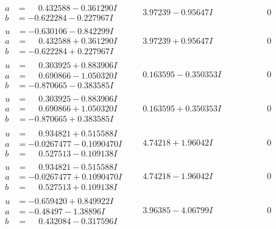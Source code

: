 \documentclass[1p]{elsarticle_modified}
\theoremstyle{definition}
\begin{document}
$$\begin{array}{c|c|c}
\begin{aligned}
a &= \phantom{-}0.432588 - 0.361290 I \\
b &= -0.622284 - 0.227967 I\end{aligned}
 & \phantom{-}3.97239 - 0.95647 I & \phantom{-0.000000 } 0 \\ \hline\begin{aligned}
u &= -0.630106 - 0.842299 I \\
a &= \phantom{-}0.432588 + 0.361290 I \\
b &= -0.622284 + 0.227967 I\end{aligned}
 & \phantom{-}3.97239 + 0.95647 I & \phantom{-0.000000 } 0 \\ \hline\begin{aligned}
u &= \phantom{-}0.303925 + 0.883906 I \\
a &= \phantom{-}0.690866 - 1.050320 I \\
b &= -0.870665 - 0.383585 I\end{aligned}
 & \phantom{-}0.163595 - 0.350353 I & \phantom{-0.000000 } 0 \\ \hline\begin{aligned}
u &= \phantom{-}0.303925 - 0.883906 I \\
a &= \phantom{-}0.690866 + 1.050320 I \\
b &= -0.870665 + 0.383585 I\end{aligned}
 & \phantom{-}0.163595 + 0.350353 I & \phantom{-0.000000 } 0 \\ \hline\begin{aligned}
u &= \phantom{-}0.934821 + 0.515588 I \\
a &= -0.0267477 - 0.1090470 I \\
b &= \phantom{-}0.527513 - 0.109138 I\end{aligned}
 & \phantom{-}4.74218 + 1.96042 I & \phantom{-0.000000 } 0 \\ \hline\begin{aligned}
u &= \phantom{-}0.934821 - 0.515588 I \\
a &= -0.0267477 + 0.1090470 I \\
b &= \phantom{-}0.527513 + 0.109138 I\end{aligned}
 & \phantom{-}4.74218 - 1.96042 I & \phantom{-0.000000 } 0 \\ \hline\begin{aligned}
u &= -0.659420 + 0.849922 I \\
a &= -0.48497 - 1.38896 I \\
b &= \phantom{-}0.432084 - 0.317596 I\end{aligned}
 & \phantom{-}3.96385 - 4.06799 I & \phantom{-0.000000 } 0 \\ \hline\begin{aligned}

\end{aligned}
\end{array}$$
\end{document}
